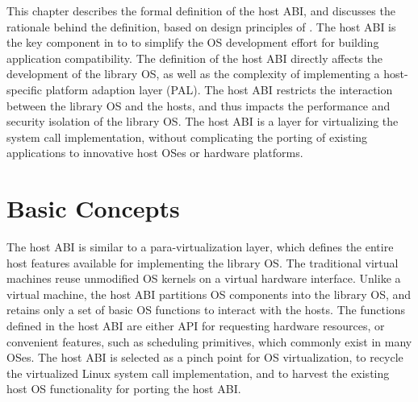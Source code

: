 




This chapter describes the formal definition of the host ABI, and discusses the rationale behind the definition, based on design principles of \graphene{}.
The host ABI is the key component
in \graphene{} to 
to simplify the OS development effort for building application compatibility.
The definition of the host ABI directly affects the development of the library OS, as well as  the complexity of implementing a host-specific platform adaption layer (PAL).
The host ABI restricts the interaction between the library OS and the hosts, and thus impacts the performance and security isolation of the library OS.
The host ABI is a layer for virtualizing the system call implementation,
without complicating the porting of existing applications to innovative host OSes or hardware platforms.


\section{Basic Concepts}


The host ABI is similar to a para-virtualization layer, which defines the entire host features
available for implementing the library OS.
The traditional virtual machines reuse unmodified OS kernels on a virtual hardware interface.
Unlike a virtual machine,
the host ABI partitions OS components into the library OS, and retains only a set of basic OS functions to interact with the hosts.
The functions defined in the host ABI
are either API for requesting hardware resources, or convenient features, such as scheduling primitives, which commonly exist in many OSes.
The host ABI is selected as a pinch point for OS virtualization,
to recycle the virtualized Linux system call implementation, and to harvest the existing host OS functionality for porting the host ABI. 

